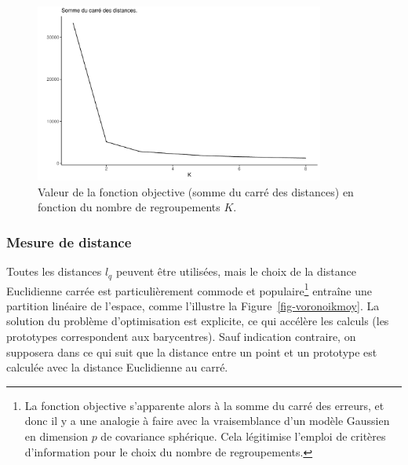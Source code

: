 \documentclass[
  11pt,
  letterpaper,
]{scrbook}
\theoremstyle{definition}
\theoremstyle{remark}
\begin{document}
\begin{figure}[ht!]

{\centering \includegraphics[width=0.85\textwidth,height=\textheight]{regroupements_files/figure-pdf/fig-coudekmoy-1.pdf}

}

\caption{\label{fig-coudekmoy}Valeur de la fonction objective (somme du
carré des distances) en fonction du nombre de regroupements \(K\).}

\end{figure}

\hypertarget{mesure-de-distance}{%
\subsubsection*{Mesure de distance}\label{mesure-de-distance}}

Toutes les distances \(l_q\) peuvent être utilisées, mais le choix de la
distance Euclidienne carrée est particulièrement commode et
populaire\footnote{La fonction objective s'apparente alors à la somme du
  carré des erreurs, et donc il y a une analogie à faire avec la
  vraisemblance d'un modèle Gaussien en dimension \(p\) de covariance
  sphérique. Cela légitimise l'emploi de critères d'information pour le
  choix du nombre de regroupements.} entraîne une partition linéaire de
l'espace, comme l'illustre la Figure~\ref{fig-voronoikmoy}. La solution
du problème d'optimisation est explicite, ce qui accélère les calculs
(les prototypes correspondent aux barycentres). Sauf indication
contraire, on supposera dans ce qui suit que la distance entre un point
et un prototype est calculée avec la distance Euclidienne au carré.
\end{document}

